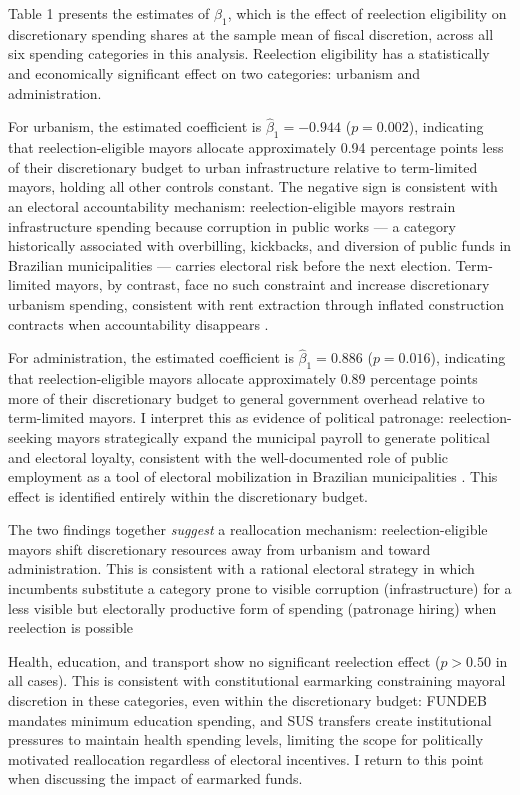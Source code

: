 \documentclass[12pt, a4paper]{article}
\begin{document}
Table 1 presents the estimates of $\beta_1$, which is the effect of reelection eligibility on discretionary spending shares at the sample mean of fiscal discretion, across all six spending categories in this analysis. Reelection eligibility has a statistically and economically significant effect on two categories: urbanism and administration.

For urbanism, the estimated coefficient is $\hat{\beta}_1 = -0.944$ ($p = 0.002$), indicating that reelection-eligible mayors allocate approximately 0.94 percentage points less of their discretionary budget to urban infrastructure relative to term-limited mayors, holding all other controls constant. The negative sign is consistent with an electoral accountability mechanism: reelection-eligible mayors restrain infrastructure spending because corruption in public works --- a category historically associated with overbilling, kickbacks, and diversion of public funds in Brazilian municipalities --- carries electoral risk before the next election. Term-limited mayors, by contrast, face no such constraint and increase discretionary urbanism spending, consistent with rent extraction through inflated construction contracts when accountability disappears \cite{ferraz:2011}.

For administration, the estimated coefficient is $\hat{\beta}_1 = 0.886$ ($p = 0.016$), indicating that reelection-eligible mayors allocate approximately 0.89 percentage points more of their discretionary budget to general government overhead relative to term-limited mayors. I interpret this as evidence of political patronage: reelection-seeking mayors strategically expand the municipal payroll to generate political and electoral loyalty, consistent with the well-documented role of public employment as a tool of electoral mobilization in Brazilian municipalities \cite{colonnelli:2020}. This effect is identified entirely within the discretionary budget.

The two findings together \textit{suggest} a reallocation mechanism: reelection-eligible mayors shift discretionary resources away from urbanism and toward administration. This is consistent with a rational electoral strategy in which incumbents substitute a category prone to visible corruption (infrastructure) for a less visible but electorally productive form of spending (patronage hiring) when reelection is possible

Health, education, and transport show no significant reelection effect ($p > 0.50$ in all cases). This is consistent with constitutional earmarking constraining mayoral discretion in these categories, even within the discretionary budget: FUNDEB mandates minimum education spending, and SUS transfers create institutional pressures to maintain health spending levels, limiting the scope for politically motivated reallocation regardless of electoral incentives. I return to this point when discussing the impact of earmarked funds.
\end{document}
